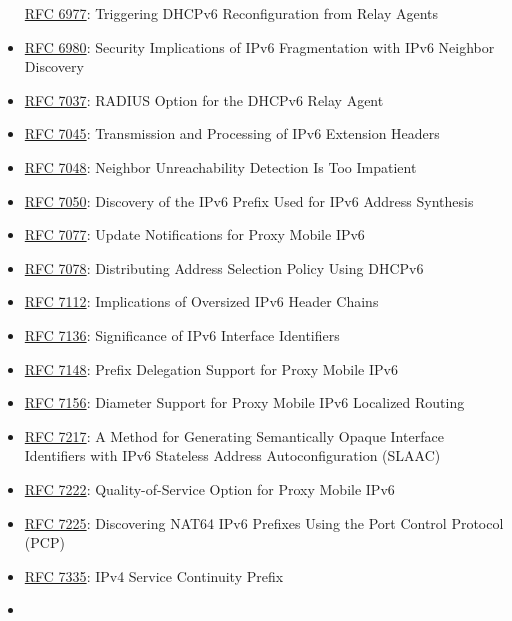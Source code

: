 \documentclass[
]{article}
\begin{document}
\begin{itemize}
  \href{https://www.rfc-editor.org/info/rfc6977}{RFC 6977}: Triggering
  DHCPv6 Reconfiguration from Relay Agents
\item
  \href{https://www.rfc-editor.org/info/rfc6980}{RFC 6980}: Security
  Implications of IPv6 Fragmentation with IPv6 Neighbor Discovery
\item
  \href{https://www.rfc-editor.org/info/rfc7037}{RFC 7037}: RADIUS
  Option for the DHCPv6 Relay Agent
\item
  \href{https://www.rfc-editor.org/info/rfc7045}{RFC 7045}: Transmission
  and Processing of IPv6 Extension Headers
\item
  \href{https://www.rfc-editor.org/info/rfc7048}{RFC 7048}: Neighbor
  Unreachability Detection Is Too Impatient
\item
  \href{https://www.rfc-editor.org/info/rfc7050}{RFC 7050}: Discovery of
  the IPv6 Prefix Used for IPv6 Address Synthesis
\item
  \href{https://www.rfc-editor.org/info/rfc7077}{RFC 7077}: Update
  Notifications for Proxy Mobile IPv6
\item
  \href{https://www.rfc-editor.org/info/rfc7078}{RFC 7078}: Distributing
  Address Selection Policy Using DHCPv6
\item
  \href{https://www.rfc-editor.org/info/rfc7112}{RFC 7112}: Implications
  of Oversized IPv6 Header Chains
\item
  \href{https://www.rfc-editor.org/info/rfc7136}{RFC 7136}: Significance
  of IPv6 Interface Identifiers
\item
  \href{https://www.rfc-editor.org/info/rfc7148}{RFC 7148}: Prefix
  Delegation Support for Proxy Mobile IPv6
\item
  \href{https://www.rfc-editor.org/info/rfc7156}{RFC 7156}: Diameter
  Support for Proxy Mobile IPv6 Localized Routing
\item
  \href{https://www.rfc-editor.org/info/rfc7217}{RFC 7217}: A Method for
  Generating Semantically Opaque Interface Identifiers with IPv6
  Stateless Address Autoconfiguration (SLAAC)
\item
  \href{https://www.rfc-editor.org/info/rfc7222}{RFC 7222}:
  Quality-of-Service Option for Proxy Mobile IPv6
\item
  \href{https://www.rfc-editor.org/info/rfc7225}{RFC 7225}: Discovering
  NAT64 IPv6 Prefixes Using the Port Control Protocol (PCP)
\item
  \href{https://www.rfc-editor.org/info/rfc7335}{RFC 7335}: IPv4 Service
  Continuity Prefix
\item

\end{itemize}
\end{document}
